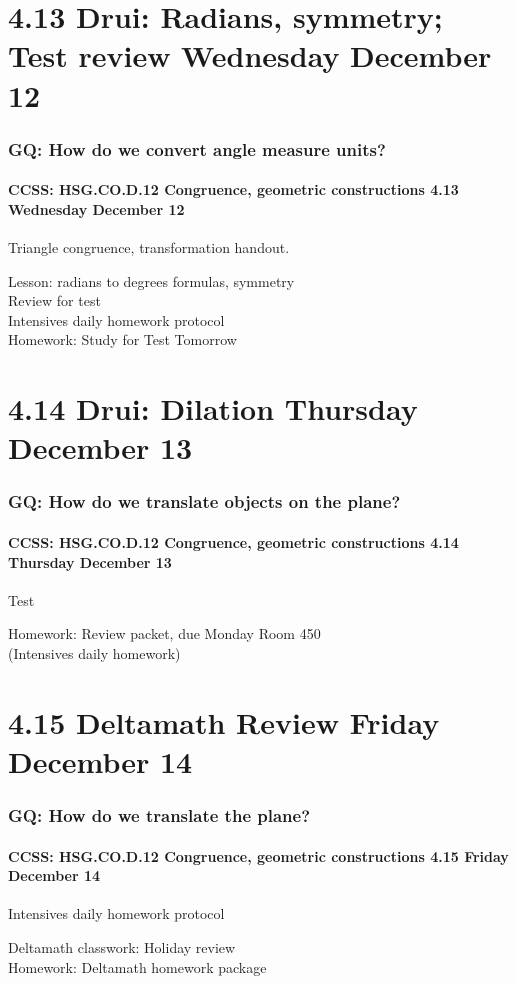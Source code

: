 \documentclass{beamer}
\begin{document}
  \section{4.13 Drui: Radians, symmetry; Test review Wednesday December 12}
    \frame
    {
      \frametitle{GQ: How do we convert angle measure units?}
      \framesubtitle{CCSS: HSG.CO.D.12 Congruence, geometric constructions  \alert{4.13 Wednesday December 12}}

      \begin{block}{Triangle congruence, transformation handout.}
      \end{block} \vspace{0.5cm}
      Lesson: radians to degrees formulas, symmetry\\
      Review for test\\[0.5cm]
      Intensives daily homework protocol \\[0.5cm]
      Homework: Study for \alert{Test Tomorrow}
    }

  \section{4.14 Drui: Dilation Thursday December 13}
    \frame
    {
      \frametitle{GQ: How do we translate objects on the plane?}
      \framesubtitle{CCSS: HSG.CO.D.12 Congruence, geometric constructions  \alert{4.14 Thursday December 13}}

      \begin{block}{\centering Test}
      \end{block} \vspace{0.5cm}
      Homework: Review packet, due Monday Room 450\\[0.5cm]
      (Intensives daily homework)
    }

  \section{4.15 Deltamath Review Friday December 14}
    \frame
    {
      \frametitle{GQ: How do we translate the plane?}
      \framesubtitle{CCSS: HSG.CO.D.12 Congruence, geometric constructions  \alert{4.15 Friday December 14}}

      \begin{block}{Intensives daily homework protocol}
      \end{block}
      Deltamath classwork: Holiday review\\[0.5cm]
      Homework: Deltamath homework package
    }
\end{document}
